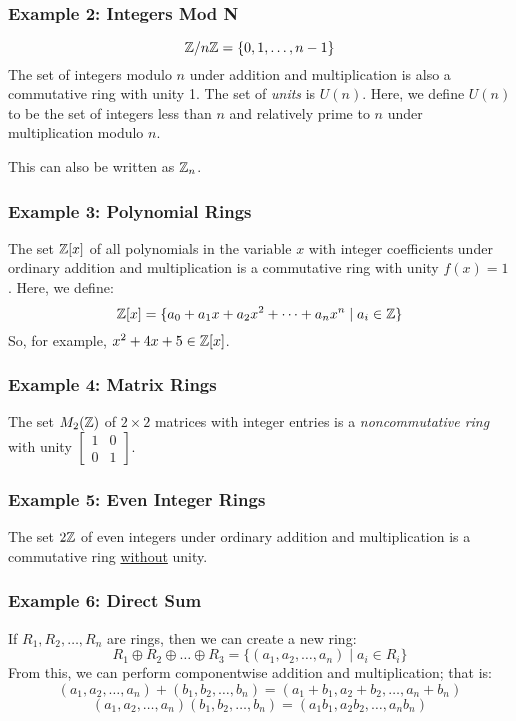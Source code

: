 \documentclass[letterpaper]{article}
\begin{document}
\subsubsection{Example 2: Integers Mod N}
\[\mathbb{Z} / n\mathbb{Z} = \{0, 1, \dots, n - 1\}\]
The set of integers modulo $n$ under addition and multiplication is also a commutative ring with unity 1. The set of \emph{units} is $U(n)$. Here, we define $U(n)$ to be the set of integers less than $n$ and relatively prime to $n$ under multiplication modulo $n$. 

\bigskip 

This can also be written as $\mathbb{Z}_n$. 

\subsubsection{Example 3: Polynomial Rings}
The set $\mathbb{Z}[x]$ of all polynomials in the variable $x$ with integer coefficients under ordinary addition and multiplication is a commutative ring with unity $f(x) = 1$. Here, we define: 
\[\mathbb{Z}[x] = \{a_0 + a_1 x + a_2 x^2 + \dots + a_n x^n \mid a_i \in \mathbb{Z}\}\]
So, for example, $x^2 + 4x + 5 \in \mathbb{Z}[x]$. 

\subsubsection{Example 4: Matrix Rings}
The set $M_{2}(\mathbb{Z})$ of $2 \times 2$ matrices with integer entries is a \emph{noncommutative ring} with unity $\begin{bmatrix} 1 & 0 \\ 0 & 1 \end{bmatrix}$.

\subsubsection{Example 5: Even Integer Rings}
The set $2\mathbb{Z}$ of even integers under ordinary addition and multiplication is a commutative ring \underline{without} unity. 

\subsubsection{Example 6: Direct Sum}
If $R_1, R_2, \dots, R_n$ are rings, then we can create a new ring: 
\[R_1 \oplus R_2 \oplus \dots \oplus R_3 = \{(a_1, a_2, \dots, a_n) \mid a_i \in R_i\}\]
From this, we can perform componentwise addition and multiplication; that is: 
\[(a_1, a_2, \dots, a_n) + (b_1, b_2, \dots, b_n) = (a_1 + b_1, a_2 + b_2, \dots, a_n + b_n)\]
\[(a_1, a_2, \dots, a_n)(b_1, b_2, \dots, b_n) = (a_1 b_1, a_2 b_2, \dots, a_n b_n)\]
\end{document}
